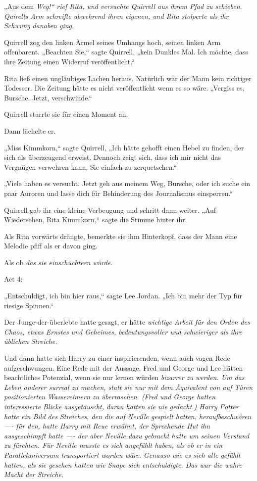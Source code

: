 {„Aus dem \emph{Weg!“ rief Rita, und versuchte Quirrell aus ihrem Pfad zu schieben. Quirells Arm schreifte abwehrend ihren eigenen, und Rita stolperte als ihr Schwung danaben ging.}

Quirrell zog den linken Ärmel seines Umhangs hoch, seinen linken Arm offenbarent. „Beachten Sie,“ sagte Quirrell, „kein Dunkles Mal. Ich möchte, dass ihre Zeitung einen Widerruf veröffentlicht.“

Rita ließ einen ungläubiges Lachen heraus. Natürlich war der Mann kein richtiger Todesser. Die Zeitung hätte es nicht veröffentlicht wenn es so wäre. „Vergiss es, Bursche. Jetzt, verschwinde.“

Quirrell starrte sie für einen Moment an.

Dann lächelte er.

„Miss Kimmkorn,“ sagte Quirrell, „Ich hätte gehofft einen Hebel zu finden, der sich als überzeugend erweist. Dennoch zeigt sich, dass ich mir nicht das Vergnügen verwehren kann, Sie einfach zu zerquetschen.“

„Viele haben es versucht. Jetzt geh aus meinem Weg, Bursche, oder ich suche ein paar Auroren und lasse dich für Behinderung des Journalismus einsperren.“

Quirrell gab ihr eine kleine Verbeugung und schritt dann weiter. „Auf Wiedersehen, Rita Kimmkorn,“ sagte die Stimme hinter ihr.

Als Rita vorwärts drängte, bemerkte sie ihm Hinterkopf, dass der Mann eine Melodie pfiff als er davon ging.

Als ob \emph{das sie einschüchtern würde.}

Act 4:

„Entschuldigt, ich bin hier raus,“ sagte Lee Jordan. „Ich bin mehr der Typ für riesige Spinnen.“

Der Junge-der-überlebte hatte gesagt, er hätte \emph{wichtige Arbeit für den Orden des Chaos, etwas Ernstes und Geheimes, bedeutungsvoller und schwieriger als ihre üblichen Streiche.}

Und dann hatte sich Harry zu einer inspirierenden, wenn auch vagen Rede aufgeschwungen. Eine Rede mit der Aussage, Fred und George und Lee hätten beachtliches Potenzial, wenn sie nur lernen würden \emph{bizarrer zu werden. Um das Leben anderer \emph{surreal} zu machen, statt sie nur mit dem Äquivalent von auf Türen positionierten Wassereimern zu überraschen. (Fred und George hatten interessierte Blicke ausgetäuscht, daran hatten sie nie gedacht.) Harry Potter hatte ein Bild des Streiches, den die auf Neville gespielt hatten, heraufbeschwören ---- für den, hatte Harry mit Reue erwähnt, der Sprechende Hut ihn ausgeschimpft hatte ---- der aber Neville dazu gebracht hatte \emph{um seinen Verstand zu fürchten}. Für Neville musste es sich angefühlt haben, als ob er in ein Paralleluniversum transportiert worden wäre. Genauso wie es sich alle gefühlt hatten, als sie gesehen hatten wie Snape sich entschuldigte. Das war die \emph{wahre Macht der Streiche.}}

}

